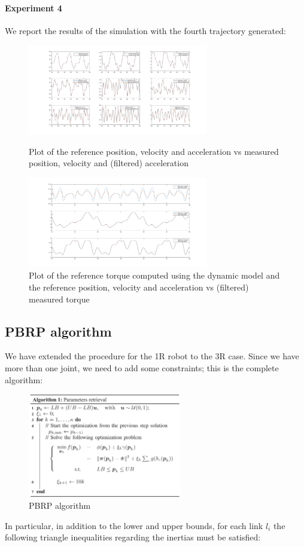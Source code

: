 \documentclass{article}
\begin{document}
\paragraph{Experiment 4}
We report the results of the simulation with the fourth trajectory generated:
\begin{figure}[!htbp]
\centering
\includegraphics[width=0.7\textwidth]{images/3-dof/experiment4_traj.png}
\caption{Plot of the reference position, velocity and acceleration vs measured position, velocity and (filtered) acceleration}
\includegraphics[width=0.7\textwidth]{images/3-dof/experiment4.png}
\caption{Plot of the reference torque computed using the dynamic model and the reference position, velocity and acceleration vs (filtered) measured torque}
\end{figure}
\pagebreak


\subsection{PBRP algorithm}
We have extended the procedure for the 1R robot to the 3R case. Since we have more than one joint, we need to add some constraints; this is the complete algorithm:
\FloatBarrier
\begin{figure}[!htbp]
\centering
\includegraphics[width=0.6\textwidth]{images/3-dof/algorithm.png}
\caption{PBRP algorithm}
\end{figure}
\FloatBarrier
In particular, in addition to the lower and upper bounds, for each link $l_i$ the following triangle inequalities regarding the inertias must be satisfied:
\end{document}
